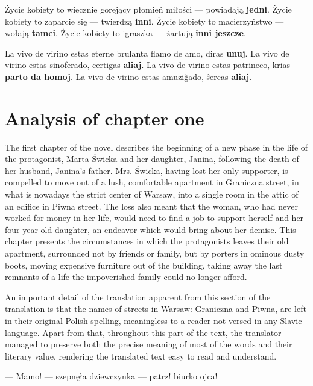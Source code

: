 \begin{displayquote}
  Życie kobiety to wiecznie gorejący płomień miłości --- powiadają \textbf{jedni}.
  Życie kobiety to zaparcie się --- twierdzą \textbf{inni}.
  Życie kobiety to macierzyństwo --- wołają \textbf{tamci}.
  Życie kobiety to igraszka --- żartują \textbf{inni jeszcze}.
\end{displayquote}

\begin{displayquote}
  La vivo de virino estas eterne brulanta flamo de amo, diras \textbf{unuj}. La vivo de virino estas sinoferado, certigas \textbf{aliaj}. La vivo de virino estas patrineco, krias \textbf{parto da homoj}. La vivo de virino estas amuziĝado, ŝercas \textbf{aliaj}.
\end{displayquote}

\section{Analysis of chapter one}

The first chapter of the novel describes the beginning of a new phase in the life of the protagonist, Marta Świcka and her daughter, Janina, following the death of her husband, Janina's father.
Mrs. Świcka, having lost her only supporter, is compelled to move out of a lush, comfortable apartment in Graniczna street, in what is nowadays the strict center of Warsaw, into a single room in the attic of an edifice in Piwna street.
The loss also meant that the woman, who had never worked for money in her life, would need to find a job to support herself and her four-year-old daughter, an endeavor which would bring about her demise.
This chapter presents the circumstances in which the protagonists leaves their old apartment, surrounded not by friends or family, but by porters in ominous dusty boots, moving expensive furniture out of the building, taking away the last remnants of a life the impoverished family could no longer afford.

An important detail of the translation apparent from this section of the translation is that the names of streets in Warsaw: Graniczna and Piwna, are left in their original Polish spelling, meaningless to a reader not versed in any Slavic language. %
Apart from that, throughout this part of the text, the translator managed to preserve both the precise meaning of most of the words and their literary value, rendering the translated text easy to read and understand.

--- Mamo! --- szepnęła dziewczynka --- patrz! biurko ojca!

